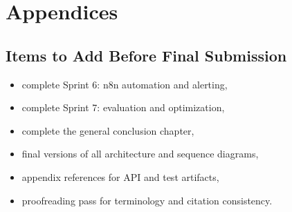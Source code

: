 \chapter{Appendices}

\addtocounter{section}{1}
\section{Items to Add Before Final Submission}
\begin{itemize}
  \item complete Sprint 6: n8n automation and alerting,
  \item complete Sprint 7: evaluation and optimization,
  \item complete the general conclusion chapter,
  \item final versions of all architecture and sequence diagrams,
  \item appendix references for API and test artifacts,
  \item proofreading pass for terminology and citation consistency.
\end{itemize}